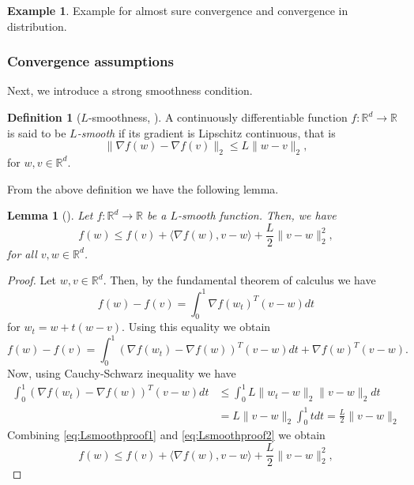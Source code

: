 \documentclass[12pt]{article}
\newtheorem{lemma}[lemma]{Lemma}
\theoremstyle{definition}
\newtheorem{example}[example]{Example}
\newtheorem{definition}[definition]{Definition}
\numberwithin{equation}{section}
\newcommand{\norm}[1]{\lVert{#1}\rVert_2}
\begin{document}
\begin{example}
  Example for almost sure convergence and convergence in distribution.
\end{example}
\subsubsection{Convergence assumptions}

Next, we introduce a strong smoothness condition.
\begin{definition}[$L$-smoothness, ]
  \label{def:l_smooth}
  A continuously differentiable function $f : \mathbb{R}^d \rightarrow \mathbb{R}$ is said to be \emph{$L$-smooth} if its gradient is Lipschitz continuous, that is 
  \begin{equation}
    \norm{\nabla f(w) - \nabla f(v) } \leq L \norm{w-v},
  \end{equation}
  for $w,v \in \mathbb{R}^d$.
\end{definition}
From the above definition we have the following lemma.
\begin{lemma}[]
  Let $f : \mathbb{R}^d \rightarrow \mathbb{R}$ be a $L$-smooth function. Then, we have 
  \begin{equation}
    f(w) \leq f(v) + \langle \nabla f(w), v - w \rangle + \frac{L}{2} \norm{ v - w }^2,
  \end{equation}
  for all $v, w \in \mathbb{R}^d$.
\end{lemma}
\begin{proof}
  Let $w, v \in \mathbb{R}^d$. Then, by the fundamental theorem of calculus we have
  $$
  f(w) - f(v) = \int_0^1 \nabla f(w_t)^T(v-w)dt 
  $$
  for $w_t = w + t(w-v)$.
  Using this equality we obtain
  \begin{equation}
    \label{eq:Lsmoothproof1}
    f(w) - f(v) = \int_0^1 (\nabla f(w_t) - \nabla f(w))^T(v-w)dt + \nabla f(w)^T(v-w).
  \end{equation}
  Now, using Cauchy-Schwarz inequality we have
  \begin{align}
    \label{eq:Lsmoothproof2}
    \int_0^1 (\nabla f(w_t) - \nabla f(w))^T(v-w)dt &\leq \int_0^1 L \norm{w_t-w} \norm{v-w}dt \\
    &= L \norm{v-w} \int_0^1 t dt = \frac{L}{2} \norm{v-w}
  \end{align}
  Combining \eqref{eq:Lsmoothproof1} and \eqref{eq:Lsmoothproof2} we obtain
  \begin{equation*}
    f(w) \leq f(v) + \langle \nabla f(w), v - w \rangle + \frac{L}{2} \norm{v - w}^2,
  \end{equation*}
\end{proof}
\end{document}
